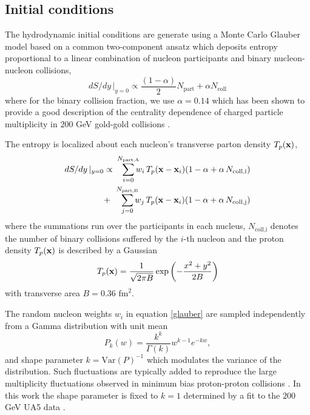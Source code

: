 \documentclass[aps,prc,reprint,amsmath,nofootinbib,superscriptaddress]{revtex4-1}
\begin{document}
\subsection{Initial conditions}
\label{initial_condition}

The hydrodynamic initial conditions are generate using a Monte Carlo Glauber model based on a common two-component ansatz which deposits entropy proportional to a linear combination 
of nucleon participants and binary nucleon-nucleon collisions,
\begin{equation}
 dS/dy \,\vert_{y=0} \propto \frac{(1-\alpha)}{2}N_\text{part} + \alpha N_\text{coll}
 \label{twocomponent}
\end{equation}
where for the binary collision fraction, we use $\alpha=0.14$ which has been shown to provide a good description of the centrality dependence of charged particle 
multiplicity in $200$ GeV gold-gold collisions \cite{Shen:2014sfi}.

The entropy is localized about each nucleon's transverse parton density $T_p({\bf x})$,
\begin{eqnarray}
 dS/dy \,\vert_{y=0} &\propto& \smashoperator{\sum_{i=0}^{N_\text{part,A}}} w_i\, T_p({\bf x} - {\bf x}_i)(1-\alpha + \alpha\, N_\text{coll,i}) \nonumber \\
                     &+& \smashoperator{\sum_{j=0}^{N_\text{part,B}}} w_j\, T_p({\bf x} - {\bf x}_i)(1-\alpha + \alpha\, N_\text{coll,j})
 \label{glauber}
\end{eqnarray}
where the summations run over the participants in each nucleus, $N_\text{coll,i}$ denotes the number of binary collisions suffered by the $i$-th nucleon 
and the proton density $T_p({\bf x})$ is described by a Gaussian
\begin{equation}
 T_p({\bf x}) = \frac{1}{\sqrt{2 \pi B}} \exp \left(-\frac{x^2+y^2}{2 B} \right)
\end{equation}
with transverse area $B = 0.36$ $\text{fm}^2$.

The random nucleon weights $w_i$ in equation \eqref{glauber} are sampled independently from a Gamma distribution with unit mean
\begin{equation}
 P_k(w) = \frac{k^k}{\Gamma(k)} w^{k-1} e^{-k w},
\end{equation}
and shape parameter $k = \text{Var}(P)^{-1}$ which modulates the variance of the distribution. 
Such fluctuations are typically added to reproduce the large multiplicity fluctuations observed in minimum bias proton-proton collisions \cite{Adare:2008ns, Dumitru:2012yr, Moreland:2012qw, Bozek:2013uha, Shen:2014sfi}. 
In this work the shape parameter is fixed to $k=1$ determined by a fit to the $200$ GeV UA5 data \cite{Ansorge:1988kn}. 
\end{document}

